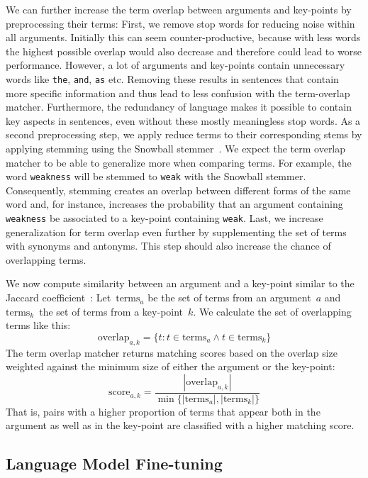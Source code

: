 We can further increase the term overlap between arguments and key-points by preprocessing their terms:
First, we remove stop words for reducing noise within all arguments.
Initially this can seem counter-productive, because with less words the highest possible overlap would also decrease and therefore could lead to worse performance.
However, a lot of arguments and key-points contain unnecessary words like \texttt{the}, \texttt{and}, \texttt{as} etc.
Removing these results in sentences that contain more specific information and thus lead to less confusion with the term-overlap matcher.
Furthermore, the redundancy of language makes it possible to contain key aspects in sentences, even without these mostly meaningless stop words.
As a second preprocessing step, we apply reduce terms to their corresponding stems by applying stemming using the Snowball stemmer~\todocite. 
We expect the term overlap matcher to be able to generalize more when comparing terms.
For example, the word \texttt{weakness} will be stemmed to \texttt{weak} with the Snowball stemmer. 
Consequently, stemming creates an overlap between different forms of the same word and, for instance, increases the probability that an argument containing \texttt{weakness} be associated to a key-point containing \texttt{weak}.
Last, we increase generalization for term overlap even further by supplementing the set of terms with synonyms and antonyms. This step should also increase the chance of overlapping terms.

We now compute similarity between an argument and a key-point similar to the Jaccard coefficient~\cite{Jaccard1902}:
Let~\(\text{terms}_a\) be the set of terms from an argument~\(a\) and \(\text{terms}_k\)~the set of terms from a key-point~\(k\).
We calculate the set of overlapping terms like this:
\begin{equation}
    \text{overlap}_{a,k} = \{ t : t \in \text{terms}_a \land t \in \text{terms}_k \}
\end{equation}
The term overlap matcher returns matching scores based on the overlap size weighted against the minimum size of either the argument or the key-point:
\begin{equation}
    \text{score}_{a,k} = \frac{ |\text{overlap}_{a,k}| }{ \min\{ |\text{terms}_a|, |\text{terms}_k| \} }
\end{equation}
That is, pairs with a higher proportion of terms that appear both in the argument as well as in the key-point are classified with a higher matching score.

\subsection{Language Model Fine-tuning}

